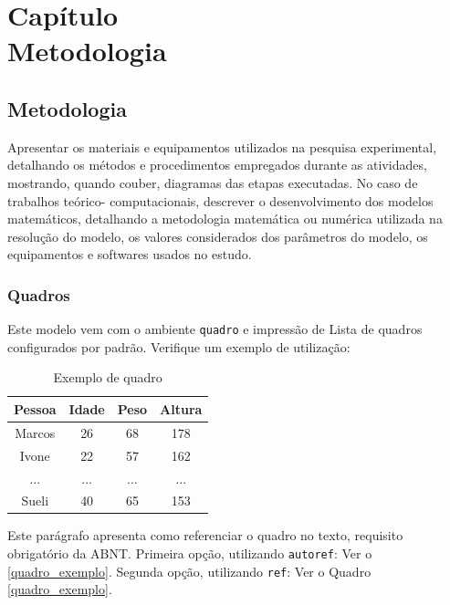 \documentclass[
	12pt,			%
	openany,			%
	oneside,			%
	a4paper,			%
	english,			%
	french,				%
	spanish,			%
	brazil				%
	]{abntex2}
\begin{document}
\part*{Capítulo \thechapter \\ Metodologia }
\addtocounter{chapter}{-1}



\chapter{Metodologia}\label{cap_trabalho_academico}
Apresentar os materiais e equipamentos utilizados na pesquisa experimental,
detalhando os métodos e procedimentos empregados durante as atividades, mostrando,
quando couber, diagramas das etapas executadas. No caso de trabalhos teórico-
computacionais, descrever o desenvolvimento dos modelos matemáticos, detalhando a
metodologia matemática ou numérica utilizada na resolução do modelo, os valores
considerados dos parâmetros do modelo, os equipamentos e softwares usados no estudo.
\section{Quadros}

Este modelo vem com o ambiente \texttt{quadro} e impressão de Lista de quadros 
configurados por padrão. Verifique um exemplo de utilização:

\begin{table}[htb]
\caption{\label{}Exemplo de quadro}
\begin{tabular}{|c|c|c|c|}
	\hline
	\textbf{Pessoa} & \textbf{Idade} & \textbf{Peso} & \textbf{Altura} \\ \hline
	Marcos & 26    & 68   & 178    \\ \hline
	Ivone  & 22    & 57   & 162    \\ \hline
	...    & ...   & ...  & ...    \\ \hline
	Sueli  & 40    & 65   & 153    \\ \hline
\end{tabular}
\end{table}

Este parágrafo apresenta como referenciar o quadro no texto, requisito
obrigatório da ABNT. 
Primeira opção, utilizando \texttt{autoref}: Ver o \autoref{quadro_exemplo}. 
Segunda opção, utilizando  \texttt{ref}: Ver o Quadro \ref{quadro_exemplo}.
\end{document}
